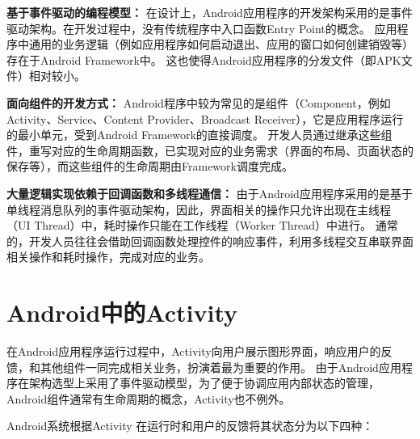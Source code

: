 \textbf{基于事件驱动的编程模型：}
在设计上，Android应用程序的开发架构采用的是事件驱动架构。在开发过程中，没有传统程序中入口函数Entry Point的概念。
应用程序中通用的业务逻辑（例如应用程序如何启动退出、应用的窗口如何创建销毁等）存在于Android Framework中。
这也使得Android应用程序的分发文件（即APK文件）相对较小。

\textbf{面向组件的开发方式：}
Android程序中较为常见的是组件（Component，例如Activity、Service、Content Provider、Broadcast Receiver），它是应用程序运行的最小单元，受到Android Framework的直接调度。
开发人员通过继承这些组件，重写对应的生命周期函数，已实现对应的业务需求（界面的布局、页面状态的保存等），而这些组件的生命周期由Framework调度完成。

\textbf{大量逻辑实现依赖于回调函数和多线程通信：}
由于Android应用程序采用的是基于单线程消息队列的事件驱动架构，因此，界面相关的操作只允许出现在主线程（UI Thread）中，耗时操作只能在工作线程（Worker Thread）中进行。
通常的，开发人员往往会借助回调函数处理控件的响应事件，利用多线程交互串联界面相关操作和耗时操作，完成对应的业务。


\section{Android中的Activity}



在Android应用程序运行过程中，Activity向用户展示图形界面，响应用户的反馈，和其他组件一同完成相关业务，扮演着最为重要的作用\cite{Activity2:online}。
由于Android应用程序在架构选型上采用了事件驱动模型，为了便于协调应用内部状态的管理，Android组件通常有生命周期的概念，Activity也不例外。

Android系统根据Activity 在运行时和用户的反馈将其状态分为以下四种：



